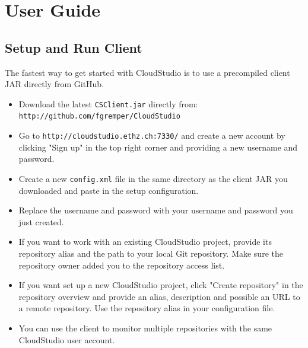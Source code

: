 

\chapter{User Guide}\label{userguide}





\section{Setup and Run Client}

The fastest way to get started with CloudStudio is to use a precompiled client JAR directly from GitHub.

\begin{itemize}

\item Download the latest \texttt{CSClient.jar} directly from: \newline \texttt{http://github.com/fgremper/CloudStudio}

\item Go to \texttt{http://cloudstudio.ethz.ch:7330/} and create a new account by clicking "Sign up" in the top right corner and providing a new username and password.

\item Create a new \texttt{config.xml} file in the same directory as the client JAR you downloaded and paste in the setup configuration.

\item Replace the username and password with your username and password you just created.

\item If you want to work with an existing CloudStudio project, provide its repository alias and the path to your local Git repository. Make sure the repository owner added you to the repository access list.

\item If you want set up a new CloudStudio project, click "Create repository" in the repository overview and provide an alias, description and possible an URL to a remote repository. Use the repository alias in your configuration file.

\item You can use the client to monitor multiple repositories with the same CloudStudio user account.

\end{itemize}

